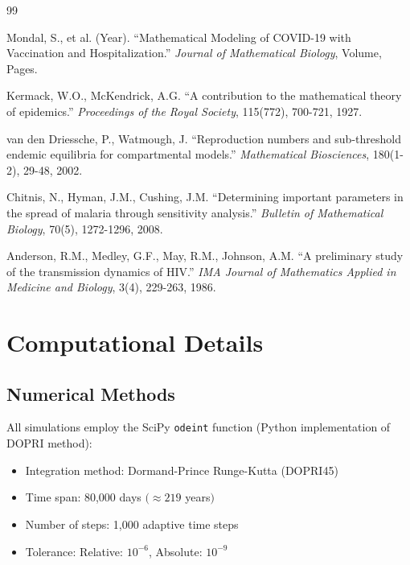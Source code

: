 \documentclass[12pt,a4paper]{report}
\begin{document}
\begin{thebibliography}{99}

Mondal, S., et al. (Year). 
``Mathematical Modeling of COVID-19 with Vaccination and Hospitalization.''
\textit{Journal of Mathematical Biology}, Volume, Pages.

Kermack, W.O., McKendrick, A.G. 
``A contribution to the mathematical theory of epidemics.''
\textit{Proceedings of the Royal Society}, 115(772), 700-721, 1927.

van den Driessche, P., Watmough, J.
``Reproduction numbers and sub-threshold endemic equilibria for compartmental models.''
\textit{Mathematical Biosciences}, 180(1-2), 29-48, 2002.

Chitnis, N., Hyman, J.M., Cushing, J.M.
``Determining important parameters in the spread of malaria through sensitivity analysis.''
\textit{Bulletin of Mathematical Biology}, 70(5), 1272-1296, 2008.

Anderson, R.M., Medley, G.F., May, R.M., Johnson, A.M.
``A preliminary study of the transmission dynamics of HIV.''
\textit{IMA Journal of Mathematics Applied in Medicine and Biology}, 3(4), 229-263, 1986.

\end{thebibliography}

\appendix

\chapter{Computational Details}

\section{Numerical Methods}

All simulations employ the SciPy \texttt{odeint} function (Python implementation of DOPRI method):
\begin{itemize}
    \item Integration method: Dormand-Prince Runge-Kutta (DOPRI45)
    \item Time span: 80,000 days $(\approx 219$ years$)$
    \item Number of steps: 1,000 adaptive time steps
    \item Tolerance: Relative: $10^{-6}$, Absolute: $10^{-9}$
\end{itemize}
\end{document}
